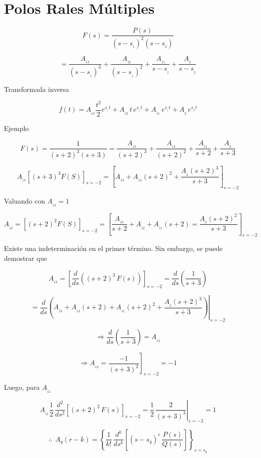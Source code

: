 



\section{Polos Rales Múltiples}

$$F(s) = \dfrac{P(s)}{(s - s_{_1})^2 (s - s_{_2})}$$

$$= \dfrac{A_{_{13}}}{(s - s_{_1})^3} + \dfrac{A_{_{12}}}{(s - s_{_1})^2} + \dfrac{A_{_{11}}}{s - s_{_1}} + \dfrac{A_{_2}}{s - s_{_2}}$$

Transformada inversa

$$f(t) = A_{_{13}} \dfrac{t^2}{2} e^{s_{_1} t} + A_{_{12}}\, t \, e^{s_{_1} t} + A_{_{11}}\,e^{s_{_1} t} + A_{_2}\, e^{s_{_2} t}$$

Ejemplo

$$F(s) = \dfrac{1}{(s + 2)^3 (s + 3)} = \dfrac{A_{_{13}}}{(s + 2)^3} + \dfrac{A_{_{12}}}{(s + 2)^2} + \dfrac{A_{_{11}}}{s + 2} + \dfrac{A_{_2}}{s + 3}$$

$$A_{_{13}} \left[ (s + 3)^3 F(S) \right]_{s = -2} = \left[ A_{_{13}} + A_{_{12}}(s + 2)^2 + \dfrac{A_{_2} (s + 2)^3}{s + 3} \right]_{s = -2}$$

Valuando con $A_{_{13}} = 1$

$$A_{_{12}} = \left[ (s + 2)^2 F(S) \right]_{s = -2} = \left[ \dfrac{A_{_{13}}}{s + 2} + A_{_{12}} + A_{_{11}}(s + 2) =\dfrac{A_{_2}(s + 2)^2}{s + 3} \right]_{s = -2}$$

Existe una indeterminación en el primer término. Sin embargo, se puede demostrar que

$$A_{_{12}} = \left[ \dfrac{d}{ds}\left( (s + 2)^3\, F(s) \right) \right]_{s = -2}  = \dfrac{d}{ds}\left( \dfrac{1}{s + 3} \right) $$

$$= \left. \dfrac{d}{ds} \left( A_{_{13}} + A_{_{12}}(s + 2) + A_{_{11}}(s + 2)^2 + \dfrac{A_{_{2}}(s + 2)^3 }{s + 3}\right)  \right|_{s = -2} $$

$$\Rightarrow \dfrac{d}{ds} \left( \dfrac{1}{s + 3} \right) = A_{_{12}}$$

$$\Rightarrow A_{_{12}} = \left. \dfrac{-1}{(s + 3)^2} \right]_{s = -2} = - 1$$

Luego, para $A_{_{11}}$

$$A_{_{11}} \dfrac{1}{2}\,\dfrac{d^2}{ds^2} \left[ (s + 2)^2\,F(s) \right]_{s = -2} = \left.  \dfrac{1}{2}\, \dfrac{2}{(s + 3)^3} \right|_{s = -2} = 1$$

$$\therefore\:\: A_{q}(r - k) = \left\lbrace \dfrac{1}{k!}\,\dfrac{d^k}{ds^k} \left[ (s - s_{q})^r \, \dfrac{P(s)}{Q(s)} \right] \right\rbrace_{s = s_{q}}$$

